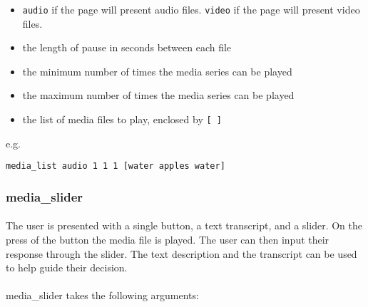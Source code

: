 \begin{itemize}
\item \texttt{audio} if the page will present audio files.  \texttt{video} if the page will present video files.
\item the length of pause in seconds between each file
\item the minimum number of times the media series can be played
\item the maximum number of times the media series can be played
\item the list of media files to play, enclosed by \texttt{[ ]}
\end{itemize}

e.g.
\begin{lstlisting}
media_list audio 1 1 1 [water apples water]
\end{lstlisting}


\subsubsection{media\_slider}

\paragraph{}
The user is presented with a single button, a text transcript, and a slider.  On the press of the button the media file is played.  The user can then input their response through the slider.  The text description and the transcript can be used to help guide their decision. 

\paragraph{}
media\_slider takes the following arguments:

